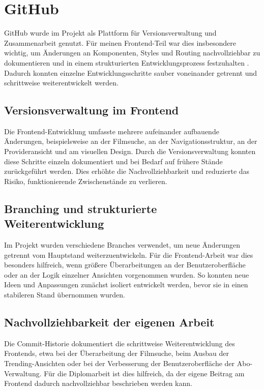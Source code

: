 \section{GitHub}
GitHub wurde im Projekt als Plattform f\"ur Versionsverwaltung und Zusammenarbeit genutzt. F\"ur meinen Frontend-Teil war dies insbesondere wichtig, um \"Anderungen an Komponenten, Styles und Routing nachvollziehbar zu dokumentieren und in einem strukturierten Entwicklungsprozess festzuhalten \cite{github_workflows}. Dadurch konnten einzelne Entwicklungsschritte sauber voneinander getrennt und schrittweise weiterentwickelt werden.

\subsection{Versionsverwaltung im Frontend}
Die Frontend-Entwicklung umfasste mehrere aufeinander aufbauende \"Anderungen, beispielsweise an der Filmsuche, an der Navigationsstruktur, an der Provideransicht und am visuellen Design. Durch die Versionsverwaltung konnten diese Schritte einzeln dokumentiert und bei Bedarf auf fr\"uhere St\"ande zur\"uckgef\"uhrt werden. Dies erh\"ohte die Nachvollziehbarkeit und reduzierte das Risiko, funktionierende Zwischenst\"ande zu verlieren.

\subsection{Branching und strukturierte Weiterentwicklung}
Im Projekt wurden verschiedene Branches verwendet, um neue \"Anderungen getrennt vom Hauptstand weiterzuentwickeln. F\"ur die Frontend-Arbeit war dies besonders hilfreich, wenn gr\"o\ss{}ere \"Uberarbeitungen an der Benutzeroberfl\"ache oder an der Logik einzelner Ansichten vorgenommen wurden. So konnten neue Ideen und Anpassungen zun\"achst isoliert entwickelt werden, bevor sie in einen stabileren Stand \"ubernommen wurden.

\subsection{Nachvollziehbarkeit der eigenen Arbeit}
Die Commit-Historie dokumentiert die schrittweise Weiterentwicklung des Frontends, etwa bei der \"Uberarbeitung der Filmsuche, beim Ausbau der Trending-Ansichten oder bei der Verbesserung der Benutzeroberfl\"ache der Abo-Verwaltung. F\"ur die Diplomarbeit ist dies hilfreich, da der eigene Beitrag am Frontend dadurch nachvollziehbar beschrieben werden kann.



